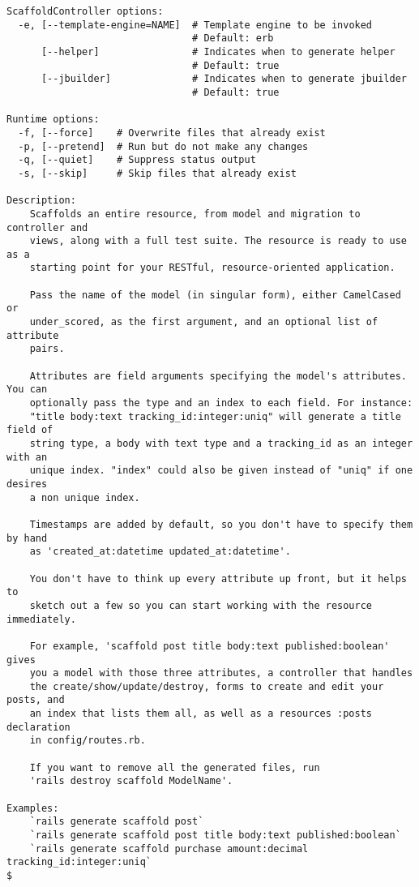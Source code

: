 \documentclass[a4paper]{book}
\begin{document}
\begin{shaded}
\begin{verbatim}
ScaffoldController options:
  -e, [--template-engine=NAME]  # Template engine to be invoked
                                # Default: erb
      [--helper]                # Indicates when to generate helper
                                # Default: true
      [--jbuilder]              # Indicates when to generate jbuilder
                                # Default: true

Runtime options:
  -f, [--force]    # Overwrite files that already exist
  -p, [--pretend]  # Run but do not make any changes
  -q, [--quiet]    # Suppress status output
  -s, [--skip]     # Skip files that already exist

Description:
    Scaffolds an entire resource, from model and migration to controller and
    views, along with a full test suite. The resource is ready to use as a
    starting point for your RESTful, resource-oriented application.

    Pass the name of the model (in singular form), either CamelCased or
    under_scored, as the first argument, and an optional list of attribute
    pairs.

    Attributes are field arguments specifying the model's attributes. You can
    optionally pass the type and an index to each field. For instance:
    "title body:text tracking_id:integer:uniq" will generate a title field of
    string type, a body with text type and a tracking_id as an integer with an
    unique index. "index" could also be given instead of "uniq" if one desires
    a non unique index.

    Timestamps are added by default, so you don't have to specify them by hand
    as 'created_at:datetime updated_at:datetime'.

    You don't have to think up every attribute up front, but it helps to
    sketch out a few so you can start working with the resource immediately.

    For example, 'scaffold post title body:text published:boolean' gives
    you a model with those three attributes, a controller that handles
    the create/show/update/destroy, forms to create and edit your posts, and
    an index that lists them all, as well as a resources :posts declaration
    in config/routes.rb.

    If you want to remove all the generated files, run
    'rails destroy scaffold ModelName'.

Examples:
    `rails generate scaffold post`
    `rails generate scaffold post title body:text published:boolean`
    `rails generate scaffold purchase amount:decimal tracking_id:integer:uniq`
$
\end{verbatim}\end{shaded}
\end{document}
